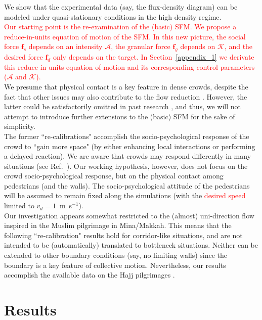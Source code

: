 \documentclass[preprint,12pt]{elsarticle}
\begin{document}
We show that the experimental data (say, the flux-density diagram) can be 
modeled under quasi-stationary conditions in the high density regime.\\

\textcolor{red}{Our starting point is the re-examination of the (basic) SFM. 
We propose a reduce-in-units equation of motion of the SFM. In this new picture,
the social force $\mathbf{f}_s$ depends on an intensity $\mathcal{A}$, the granular
force $\mathbf{f}_g$ depends on $\mathcal{K}$, and the desired force $\mathbf{f}_d$
only depends on the target. In Section~\ref{appendix_1} we derivate this 
reduce-in-units equation of motion and its corresponding control parameters ($\mathcal{A}$ and $\mathcal{K}$). }\\

 We presume that physical contact is
a key feature in dense crowds, despite the fact that other issues may
also contribute to the flow reduction \cite{johansson1}. However, the latter could
be satisfactorily omitted in past research \cite{johansson}, and thus, we will not
attempt to introduce further extensions to the (basic) SFM for the
sake of simplicity.\\

The former ``re-calibrations" accomplish the socio-psychological
response of the crowd to ``gain more space" (by either enhancing local
interactions or performing a delayed reaction). We are aware that
crowds may respond differently in many situations (see Ref.~\cite{drury1}). Our working
hypothesis, however, does not focus on the crowd socio-psychological
response, but on the physical contact among pedestrians (and the
walls). The socio-psychological attitude of the pedestrians will be
assumed to remain fixed along the simulations (with the 
\textcolor{red}{desired speed} limited to $v_d=1\,$ m~s$^{-1}$). \\


Our investigation appears somewhat restricted to the (almost)
uni-direction flow inspired in the Muslim pilgrimage in Mina/Makkah.
This means that the following ``re-calibration" results hold for
corridor-like situations, and are not intended to be (automatically)
translated to bottleneck situations. Neither can be extended to other
boundary conditions (say, no limiting walls) since the boundary is a
key feature of collective motion. Nevertheless, our results accomplish
the available data on the Hajj pilgrimages \cite{helbing3,lohner1}.



\section{\label{results}Results}
\end{document}
